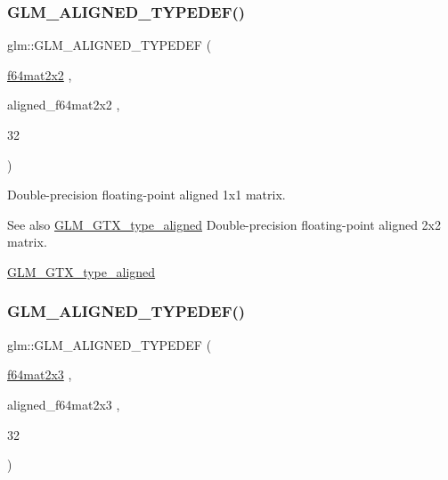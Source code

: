 \subsubsection{\texorpdfstring{G\+L\+M\+\_\+\+A\+L\+I\+G\+N\+E\+D\+\_\+\+T\+Y\+P\+E\+D\+E\+F()}{GLM\_ALIGNED\_TYPEDEF()}\hspace{0.1cm}{\footnotesize\ttfamily [196/209]}}
{\footnotesize\ttfamily glm\+::\+G\+L\+M\+\_\+\+A\+L\+I\+G\+N\+E\+D\+\_\+\+T\+Y\+P\+E\+D\+EF (\begin{DoxyParamCaption}\item[{\hyperlink{group__gtc__type__precision_ga1e14d8b4e18898be51cd719fda213dcc}{f64mat2x2}}]{,  }\item[{aligned\+\_\+f64mat2x2}]{,  }\item[{32}]{ }\end{DoxyParamCaption})}

Double-\/precision floating-\/point aligned 1x1 matrix. \begin{DoxySeeAlso}{See also}
\hyperlink{group__gtx__type__aligned}{G\+L\+M\+\_\+\+G\+T\+X\+\_\+type\+\_\+aligned} Double-\/precision floating-\/point aligned 2x2 matrix. 

\hyperlink{group__gtx__type__aligned}{G\+L\+M\+\_\+\+G\+T\+X\+\_\+type\+\_\+aligned} 
\end{DoxySeeAlso}
\mbox{\label{group__gtx__type__aligned_gab059d7b9fe2094acc563b7223987499f}} 
\subsubsection{\texorpdfstring{G\+L\+M\+\_\+\+A\+L\+I\+G\+N\+E\+D\+\_\+\+T\+Y\+P\+E\+D\+E\+F()}{GLM\_ALIGNED\_TYPEDEF()}\hspace{0.1cm}{\footnotesize\ttfamily [197/209]}}
{\footnotesize\ttfamily glm\+::\+G\+L\+M\+\_\+\+A\+L\+I\+G\+N\+E\+D\+\_\+\+T\+Y\+P\+E\+D\+EF (\begin{DoxyParamCaption}\item[{\hyperlink{group__gtc__type__precision_ga6d0196bded514d55e26e0f68dd38b37b}{f64mat2x3}}]{,  }\item[{aligned\+\_\+f64mat2x3}]{,  }\item[{32}]{ }\end{DoxyParamCaption})}


